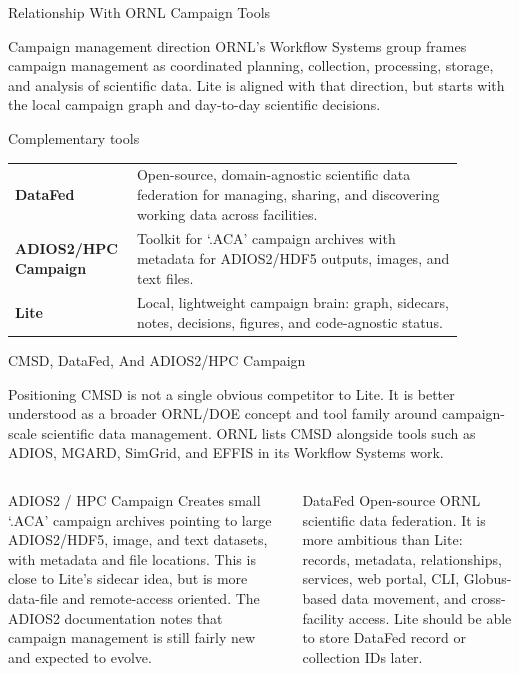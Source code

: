 \documentclass[aspectratio=169,11pt]{beamer}
\begin{document}
\begin{frame}{Relationship With ORNL Campaign Tools}
  \begin{block}{Campaign management direction}
    \small
    ORNL's Workflow Systems group frames campaign management as coordinated
    planning, collection, processing, storage, and analysis of scientific data.
    Lite is aligned with that direction, but starts with the local campaign
    graph and day-to-day scientific decisions.
  \end{block}

  \begin{block}{Complementary tools}
    \small
    \begin{tabular}{>{\bfseries}p{0.20\linewidth}p{0.69\linewidth}}
      \toprule
      DataFed & Open-source, domain-agnostic scientific data federation for managing, sharing, and discovering working data across facilities. \\
      ADIOS2/HPC Campaign & Toolkit for `.ACA' campaign archives with metadata for ADIOS2/HDF5 outputs, images, and text files. \\
      Lite & Local, lightweight campaign brain: graph, sidecars, notes, decisions, figures, and code-agnostic status. \\
      \bottomrule
    \end{tabular}
  \end{block}
\end{frame}

\begin{frame}{CMSD, DataFed, And ADIOS2/HPC Campaign}
  \begin{block}{Positioning}
    \small
    CMSD is not a single obvious competitor to Lite.  It is better understood
    as a broader ORNL/DOE concept and tool family around campaign-scale
    scientific data management.  ORNL lists CMSD alongside tools such as ADIOS,
    MGARD, SimGrid, and EFFIS in its Workflow Systems work.
  \end{block}

  \begin{columns}[T]
    \begin{block}{ADIOS2 / HPC Campaign}
      \scriptsize
      Creates small `.ACA' campaign archives pointing to large ADIOS2/HDF5,
      image, and text datasets, with metadata and file locations.  This is
      close to Lite's sidecar idea, but is more data-file and remote-access
      oriented.  The ADIOS2 documentation notes that campaign management is
      still fairly new and expected to evolve.
    \end{block}

    \begin{block}{DataFed}
      \scriptsize
      Open-source ORNL scientific data federation.  It is more ambitious than
      Lite: records, metadata, relationships, services, web portal, CLI,
      Globus-based data movement, and cross-facility access.  Lite should be
      able to store DataFed record or collection IDs later.
    \end{block}
  \end{columns}
\end{frame}
\end{document}
